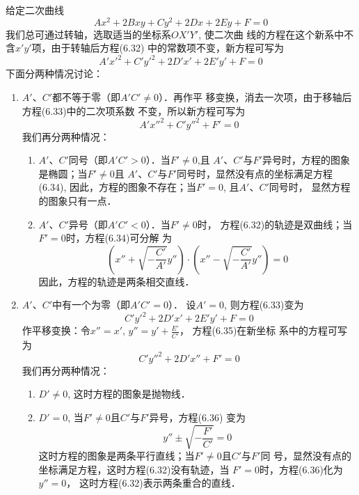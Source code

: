 给定二次曲线
\begin{equation}
 Ax^2+2Bxy+Cy^2+2Dx+2Ey+F=0   
\end{equation}
我们总可通过转轴，选取适当的坐标系$OX'Y'$, 使二次曲
线的方程在这个新系中不含$x'y'$项，由于转轴后方程(6.32)
中的常数项不变，新方程可写为
\begin{equation}
    A'{x'}^2+C'{y'}^2+2D'x'+2E'y'+F=0
\end{equation}
下面分两种情况讨论：
\begin{enumerate}
    \item $A'$、$C'$都不等于零（即$A'C'\ne 0$）．再作平
移变换，消去一次项，由于移轴后方程(6.33)中的二次项系数
不变，所以新方程可写为
\begin{equation}
    A'{x''}^2+C'{y''}^2+F'=0
\end{equation}
我们再分两种情况：
\begin{enumerate}
\item $A'$、$C'$同号（即$A'C'>0$）．当$F'\ne 0$,且
$A'$、$C'$与$F'$异号时，方程的图象是椭圆；当$F'\ne 0$且
$A'$、$C'$与$F'$同号时，显然没有点的坐标满足方程(6.34), 
因此，方程的图象不存在；当$F'= 0$, 且$A'$、$C'$同号时，
显然方程的图象只有一点．
\item $A'$、$C'$异号（即$A'C'<0$）．当$F'\ne 0$时，
方程(6.32)的轨迹是双曲线；当$F'= 0$时，方程(6.34)可分解
为
\[\left(x''+\sqrt{-\frac{C'}{A'}}y''\right)\cdot \left(x''-\sqrt{-\frac{C'}{A'}}y''\right)=0\]
因此，方程的轨迹是两条相交直线．
\end{enumerate}
\item $A'$、$C'$中有一个为零（即$A'C'=0$）．
设$A'=0$, 则方程(6.33)变为
\begin{equation}
    C'{y'}^2+2D'x'+2E'y'+F=0
\end{equation}
作平移变换：令$x''=x'$, $y''=y'+\frac{E'}{C'}$，
方程(6.35)在新坐标
系中的方程可写为
\begin{equation}
    C'{y''}^2+2D'x''+F'=0
\end{equation}
我们再分两种情况：
\begin{enumerate}
    \item $D'\ne 0$, 这时方程的图象是抛物线．
    \item $D'=0$, 当$F'\ne 0$且$C'$与$F'$异号，方程(6.36)
    变为
    \[y''\pm \sqrt{-\frac{F'}{C'}}=0\]
    这时方程的图象是两条平行直线；当$F'\ne 0$且$C'$与$F'$同
号，显然没有点的坐标满足方程，这时方程(6.32)没有轨迹，当
$F'=0$时，方程(6.36)化为$y''=0$，
这时方程(6.32)表示两条重合的直线．
\end{enumerate}
\end{enumerate}



